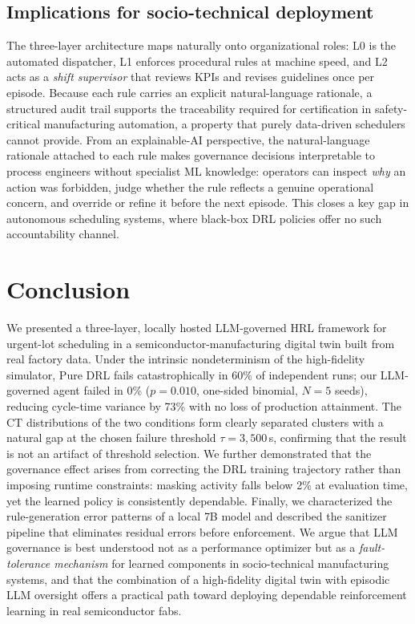 \documentclass[10pt]{article}
\begin{document}
\subsection{Implications for socio-technical deployment}
The three-layer architecture maps naturally onto organizational roles: L0 is the
automated dispatcher, L1 enforces procedural rules at machine speed, and L2 acts
as a \emph{shift supervisor} that reviews KPIs and revises guidelines once per
episode. Because each rule carries an explicit natural-language rationale, a structured
audit trail supports the traceability required for
certification in safety-critical manufacturing automation, a property that purely
data-driven schedulers cannot provide. From an explainable-AI perspective, the
natural-language rationale attached to each rule makes governance decisions
interpretable to process engineers without specialist ML knowledge: operators
can inspect \emph{why} an action was forbidden, judge whether the rule reflects
a genuine operational concern, and override or refine it before the next
episode. This closes a key gap in autonomous scheduling systems, where
black-box DRL policies offer no such accountability channel.

\section{Conclusion}
We presented a three-layer, locally hosted LLM-governed HRL framework for
urgent-lot scheduling in a semiconductor-manufacturing digital twin built from
real factory data.
Under the intrinsic nondeterminism of the high-fidelity simulator,
Pure DRL fails catastrophically in 60\% of independent runs;
our LLM-governed agent failed in 0\% ($p=0.010$, one-sided binomial, $N=5$ seeds),
reducing cycle-time variance by 73\% with no loss of production attainment.
The CT distributions of the two conditions form clearly separated clusters
with a natural gap at the chosen failure threshold $\tau=3{,}500$\,s,
confirming that the result is not an artifact of threshold selection.
We further demonstrated that the governance effect arises from correcting the
DRL training trajectory rather than imposing runtime constraints: masking
activity falls below 2\% at evaluation time, yet the learned policy is
consistently dependable.
Finally, we characterized the rule-generation error patterns of a local 7B
model and described the sanitizer pipeline that eliminates residual errors
before enforcement.
We argue that LLM governance is best understood not as a performance optimizer
but as a \emph{fault-tolerance mechanism} for learned components in
socio-technical manufacturing systems, and that the combination of a
high-fidelity digital twin with episodic LLM oversight offers a practical
path toward deploying dependable reinforcement learning in real semiconductor fabs.
\end{document}
